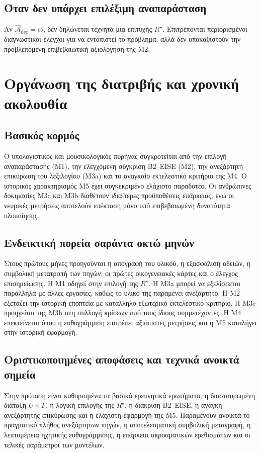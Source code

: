 \documentclass[11pt,a4paper]{extarticle}
\begin{document}
\subsection*{Όταν δεν υπάρχει επιλέξιμη αναπαράσταση}
Αν \(\widehat{\mathcal A}_{\mathrm{dec}}=\varnothing\), δεν δηλώνεται τεχνητά μια επιτυχής \(R^\star\). Επιτρέπονται περιορισμένοι διαγνωστικοί έλεγχοι για να εντοπιστεί το πρόβλημα, αλλά δεν υποκαθιστούν την προβλεπόμενη επιβεβαιωτική αξιολόγηση της M2.


\section{Οργάνωση της διατριβής και χρονική ακολουθία}
\subsection*{Βασικός κορμός}
Ο υπολογιστικός και μουσικολογικός πυρήνας συγκροτείται από την επιλογή αναπαράστασης (M1), την ελεγχόμενη σύγκριση B2--EISE (M2), την ανεξάρτητη επικύρωση του λεξιλογίου (M3a) και το αναγκαίο εκτελεστικό κριτήριο της M4. Ο ιστορικός χαρακτηρισμός M5 έχει συγκεκριμένο ελάχιστο παραδοτέο. Οι ανθρώπινες δοκιμασίες M3c και M3b διαθέτουν ιδιαίτερες προϋποθέσεις επάρκειας, ενώ οι νευρικές μετρήσεις αποτελούν επέκταση μόνο υπό επιβεβαιωμένη δυνατότητα υλοποίησης.

\subsection*{Ενδεικτική πορεία σαράντα οκτώ μηνών}
Στους πρώτους μήνες προηγούνται η απογραφή του υλικού, η εξασφάλιση αδειών, η συμβολική μετατροπή των πηγών, οι πρώτες οικογενειακές κάρτες και ο έλεγχος επισημείωσης. Η M1 οδηγεί στην επιλογή της \(R^\star\). Η M3a μπορεί να εξελίσσεται παράλληλα με άλλες εργασίες, καθώς το υλικό της παραμένει ανεξάρτητο. Η M2 εξετάζει την ιστορική εποπτεία με κατάλληλο εξωτερικό εκτελεστικό κριτήριο. Η M3c προηγείται της M3b στη συλλογή κρίσεων από τους ίδιους συμμετέχοντες. Η M4 επεκτείνεται όπου η ευθυγράμμιση επιτρέπει αξιόπιστες μετρήσεις και η M5 καταλήγει στην ιστορική εφαρμογή.

\subsection*{Οριστικοποιημένες αποφάσεις και τεχνικά ανοικτά σημεία}
Στην πρόταση είναι καθορισμένα τα βασικά ερευνητικά ερωτήματα, η διασταυρωμένη διάταξη \(U\times F\), η λογική επιλογής της \(R^\star\), η διάκριση B2--EISE, η ανάγκη ανεξάρτητης επικύρωσης και η ελάχιστη εφαρμογή της M5. Παραμένουν ανοικτά το πραγματικό πλήθος ανεξάρτητων πηγών, η αποτελεσματική συμβολική μεταγραφή, η λεπτομέρεια ηχητικής ευθυγράμμισης, η επάρκεια ακροαματικών ερεθισμάτων και οι τελικές παράμετροι των μοντέλων.
\end{document}
